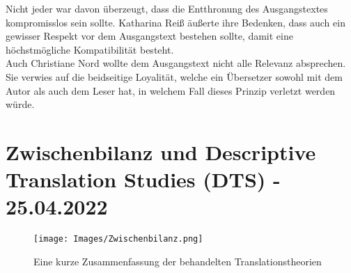 \documentclass{article}
\begin{document}
	Nicht jeder war davon überzeugt, dass die Entthronung des Ausgangstextes kompromisslos sein sollte. Katharina Reiß äußerte ihre Bedenken, dass auch ein gewisser Respekt vor dem Ausgangstext bestehen sollte, damit eine höchstmögliche Kompatibilität besteht. \\
	Auch Christiane Nord wollte dem Ausgangstext nicht alle Relevanz absprechen. Sie verwies auf die beidseitige Loyalität, welche ein Übersetzer sowohl mit dem Autor als auch dem Leser hat, in welchem Fall dieses Prinzip verletzt werden würde. \\
	
	\section{Zwischenbilanz und Descriptive Translation Studies (DTS) - 25.04.2022}
	\begin{figure}[H]
		\centering
		\texttt{[image: Images/Zwischenbilanz.png]}
		\caption{Eine kurze Zusammenfassung der behandelten Translationstheorien}
	\end{figure}
\end{document}
